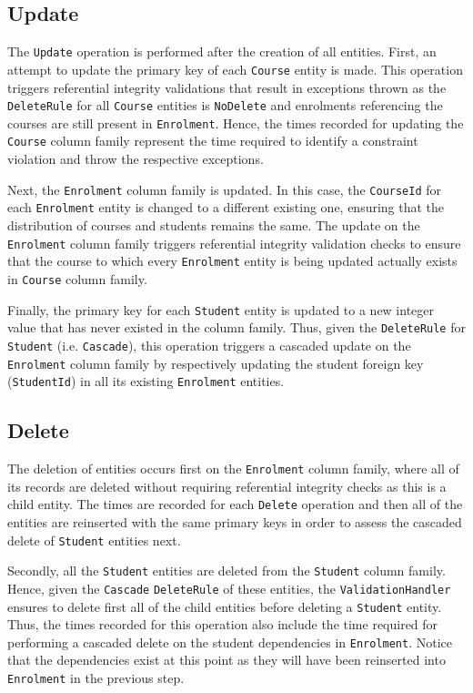 \subsection{Update}
The \texttt{Update} operation is performed after the
creation of all entities.  First,  an attempt to update the primary key of each
 \texttt{Course} entity is made.  This operation triggers referential integrity
 validations that result in exceptions thrown as the \texttt{DeleteRule} for all
 \texttt{Course} entities is \texttt{NoDelete} and enrolments referencing the
 courses are still present in \texttt{Enrolment}.  Hence, the times recorded for
  updating the \texttt{Course} column family represent the time required to
 identify a constraint violation and throw the respective exceptions.
					
Next,  the \texttt{Enrolment} column family is updated.  In this case,  the
\texttt{CourseId} for each \texttt{Enrolment} entity is changed to a different
existing one,  ensuring that the distribution of courses and students remains
the same. The update on the \texttt{Enrolment} column family triggers
referential integrity validation checks to ensure that the course to which every
\texttt{Enrolment} entity is being updated actually exists in \texttt{Course}
column family. 
					
Finally,  the primary key for each \texttt{Student} entity is updated to a new
integer value that has never existed in the column family. Thus, given
the \texttt{DeleteRule} for \texttt{Student} (i.e. \texttt{Cascade}),  this
operation triggers a cascaded update on the \texttt{Enrolment} column family   
 by respectively updating the student foreign key (\texttt{StudentId}) in all
 its existing \texttt{Enrolment} entities.
		
\subsection{Delete} 
The deletion of entities occurs first on the
\texttt{Enrolment} column family,  where all of its records are deleted without
requiring referential integrity checks as this is a child entity.  The times are
recorded for each \texttt{Delete} operation and then all of the entities are
reinserted with the same primary keys in order to assess the cascaded delete of
\texttt{Student} entities next. 
				
Secondly,  all  the \texttt{Student} entities are deleted from the
\texttt{Student} column family. Hence, given the \texttt{Cascade}
\texttt{DeleteRule} of these entities,  the \texttt{ValidationHandler} ensures
to delete first all of the child entities before deleting a \texttt{Student} entity. 
Thus,  the times recorded for this operation also include the time required for
performing a cascaded delete on the student dependencies in \texttt{Enrolment}.
Notice that the dependencies exist at this point as they will have been reinserted into
\texttt{Enrolment} in the previous step. 
				

